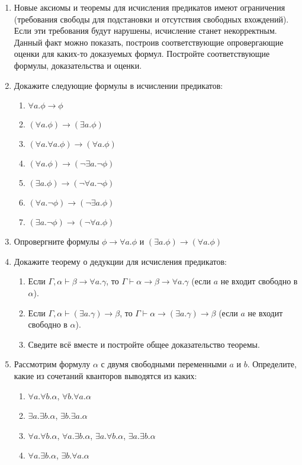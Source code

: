 \documentclass[10pt,a4paper,oneside]{article}
\begin{document}
\begin{enumerate}
\item Новые аксиомы и теоремы для исчисления предикатов имеют ограничения
(требования свободы для подстановки и отсутствия свободных вхождений). 
Если эти требования будут нарушены, исчисление станет некорректным.
Данный факт можно показать, построив соответствующие опровергающие
оценки для каких-то доказуемых формул. Постройте соответствующие формулы,
доказательства и оценки.

\item Докажите следующие формулы в исчислении предикатов:
\begin{enumerate}
\item $\forall a.\phi\rightarrow \phi$
\item $(\forall a.\phi)\rightarrow (\exists a.\phi)$
\item $(\forall a.\forall a.\phi) \rightarrow (\forall a.\phi)$
\item $(\forall a.\phi) \rightarrow (\neg \exists a.\neg \phi)$ 
\item $(\exists a.\phi) \rightarrow (\neg \forall a.\neg \phi)$
\item $(\forall a.\neg\phi) \rightarrow (\neg \exists a.\phi)$ 
\item $(\exists a.\neg\phi) \rightarrow (\neg \forall a.\phi)$
\end{enumerate}

\item Опровергните формулы $\phi\rightarrow\forall a. \phi$ и $(\exists a.\phi)\rightarrow (\forall a.\phi)$

\item Докажите теорему о дедукции для исчисления предикатов:
\begin{enumerate}
\item Если $\Gamma, \alpha \vdash \beta\rightarrow\forall a.\gamma$, то
$\Gamma\vdash\alpha\rightarrow\beta\rightarrow\forall a.\gamma$ (если $a$ не входит
свободно в $\alpha$).
\item Если $\Gamma, \alpha \vdash (\exists a.\gamma)\rightarrow\beta$, то
$\Gamma\vdash\alpha\rightarrow(\exists a.\gamma)\rightarrow\beta$ (если $a$ не входит
свободно в $\alpha$).
\item Сведите всё вместе и постройте общее доказательство теоремы.
\end{enumerate}

\item Рассмотрим формулу $\alpha$ с двумя свободными переменными $a$ и $b$.
Определите, какие из сочетаний кванторов выводятся из каких:
\begin{enumerate}
\item $\forall a.\forall b.\alpha$, $\forall b.\forall a.\alpha$
\item $\exists a.\exists b.\alpha$, $\exists b.\exists a.\alpha$
\item $\forall a.\forall b.\alpha$, $\forall a.\exists b.\alpha$, $\exists a.\forall b.\alpha$, $\exists a.\exists b.\alpha$
\item $\forall a.\exists b.\alpha$, $\exists b.\forall a.\alpha$
\end{enumerate}

\end{enumerate}
\end{document}
